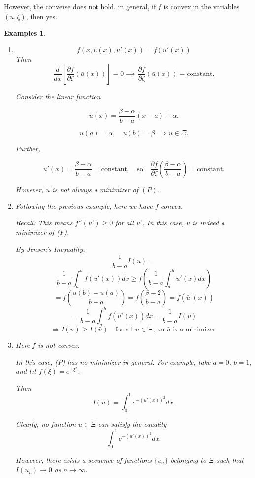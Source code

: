 \documentclass[12pt]{report}
\newtheorem{examples}{Examples}[section]
\begin{document}
However, the converse does not hold. in general, if \(f\) is convex in the variables \((u, \zeta)\), then yes. 
\begin{examples}
\begin{enumerate}
    \item \[f(x, u(x), u'(x)) = f(u'(x))\]
Then
\[
\frac{d}{dx} \left[ \frac{\partial f}{\partial \zeta}(\bar{u}(x)) \right] = 0 \implies \frac{\partial f}{\partial \zeta}(\bar{u}(x)) = \text{constant}.
\]

Consider the linear function

\[
\bar{u}(x) = \frac{\beta - \alpha}{b - a}(x - a) + \alpha.
\]

\[
\bar{u}(a) = \alpha, \quad \bar{u}(b) = \beta \implies \bar{u} \in \Xi.
\]

Further,

\[
\bar{u}'(x) = \frac{\beta - \alpha}{b - a} = \text{constant}, \quad \text{so} \quad \frac{\partial f}{\partial \zeta}\left(\frac{\beta - \alpha}{b - a}\right) = \text{constant}.
\]

However, $\bar{u}$ is not always a minimizer of $(P)$.
\item Following the previous example, here we have \(f\) convex.

Recall: This means \( f''(u') \geq 0 \) for all \( u' \). In this case, \( \bar{u} \) is indeed a minimizer of (P).

By Jensen’s Inequality,
\[
\frac{1}{b-a} I(u) =
\]
\[
\frac{1}{b-a} \int_{a}^{b} f(u' (x)) dx \geq f \left( \frac{1}{b-a} \int_{a}^{b} u' (x) dx \right)
\]
\[
= f \left( \frac{u(b) - u(a)}{b-a} \right) = f \left( \frac{\beta - 2}{b-a} \right) = f \left( \bar{u}^i (x) \right)
\]
\[
= \frac{1}{b-a} \int_{a}^{b} f(\bar{u}^i (x)) dx = \frac{1}{b-a} I(\bar{u})
\]
\[
\Rightarrow I(u) \geq I(\bar{u}) \quad \text{for all } u \in \Xi, \text{ so } \bar{u} \text{ is a minimizer.}
\]
\item Here \( f \) is not convex.

In this case, (P) has no minimizer in general.  
For example, take \( a = 0 \), \( b = 1 \), and let \( f(\xi) = e^{-\xi^2} \).  

Then  
\[
I(u) = \int_{0}^{1} e^{-(u'(x))^2} dx.
\]

Clearly, no function \( u \in \Xi \) can satisfy the equality  
\[
\int_{0}^{1} e^{-(u'(x))^2} dx.
\]

However, there exists a sequence of functions \( \{ u_n \} \) belonging to \( \Xi \) such that  
\( I(u_n) \to 0 \) as \( n \to \infty \).  


\end{enumerate}
\end{examples}
\end{document}
